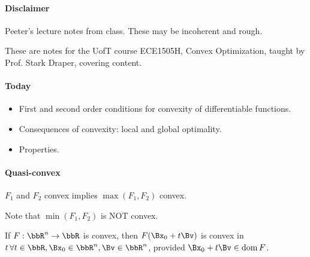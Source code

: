 
\renewcommand{\basename}{convexOptimization6}
\renewcommand{\dirname}{notes/ece1505/}
\newcommand{\keywords}{ECE1505H}


\usepackage{ece1505}
\usepackage{peeters_braket}
\usepackage{peeters_layout_exercise}
\usepackage{peeters_figures}
\usepackage{macros_qed}
\usepackage{mathtools}
\usepackage{siunitx}
\usepackage{enumerate}

\beginArtNoToc
{}
\label{chap:convexOptimization6}

\paragraph{Disclaimer}

Peeter's lecture notes from class.  These may be incoherent and rough.

These are notes for the UofT course ECE1505H, Convex Optimization, taught by Prof. Stark Draper, covering  \citep{boyd2004convex} content.

\paragraph{Today}

\begin{itemize}
\item First and second order conditions for convexity of differentiable functions.
\item Consequences of convexity: local and global optimality.
\item Properties.
\end{itemize}

\paragraph{Quasi-convex}

\( F_1 \) and \( F_2 \) convex implies \( \max( F_1, F_2) \) convex.


Note that \( \min(F_1, F_2) \) is NOT convex.

If \( F : \bbR^n \rightarrow \bbR \) is convex, then
\( F( \Bx_0 + t \Bv ) \) is convex in \( t\,\forall t \in \bbR, \Bx_0 \in \bbR^n, \Bv \in \bbR^n \), provided \( \Bx_0 + t \Bv \in \dom F \).

